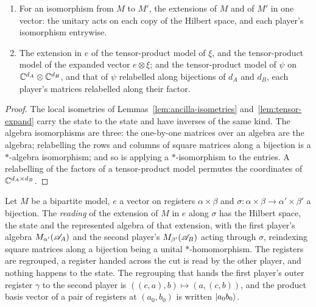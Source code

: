 \begin{lemma}
\begin{enumerate}
    of the two registers; and the extension in $e$ with the players exchanged, and the extension of
    the exchanged model in the exchanged vector, which has the norm of $e$.
  \item For an isomorphism from $M$ to $M'$, the extensions of $M$ and of $M'$ in one vector: the
    unitary acts on each copy of the Hilbert space, and each player's isomorphism entrywise.
  \item The extension in $e$ of the tensor-product model of $\xi$, and the tensor-product model of
    the expanded vector $e \otimes \xi$; and the tensor-product model of $\psi$ on
    $\mathbb{C}^{d_A} \otimes \mathbb{C}^{d_B}$, and that of $\psi$ relabelled along bijections of $d_A$ and $d_B$,
    each player's matrices relabelled along their factor.
\end{enumerate}
\end{lemma}

\begin{proof}
\leanok
The local isometries of Lemmas~\ref{lem:ancilla-isometries} and~\ref{lem:tensor-expand} carry the
state to the state and have inverses of the same kind. The algebra isomorphisms are three: the
one-by-one matrices over an algebra are the algebra; relabelling the rows and columns of square
matrices along a bijection is a $*$-algebra isomorphism; and so is applying a $*$-isomorphism to the
entries. A relabelling of the factors of a tensor-product model permutes the coordinates of
$\mathbb{C}^{d_A \times d_B}$.
\end{proof}

\begin{definition}
\label{def:model-reading}
\leanok
Let $M$ be a bipartite model, $e$ a vector on registers $\alpha \times \beta$ and $\sigma : \alpha
\times \beta \to \alpha' \times \beta'$ a bijection. The \emph{reading} of the extension of $M$ in
$e$ along $\sigma$ has the Hilbert space, the state and the represented algebra of that extension,
with the first player's algebra $M_{\alpha'}(\mathscr{A}_A)$ and the second player's $M_{\beta'}(\mathscr{A}_B)$
acting through $\sigma$, reindexing square matrices along a bijection being a unital
$*$-homomorphism. The registers are regrouped, a register handed across the cut is read by the other
player, and nothing happens to the state. The regrouping that hands the first player's outer
register $\gamma$ to the second player is $((c, a), b) \mapsto (a, (c, b))$, and the product basis
vector of a pair of registers at $(a_0, b_0)$ is written $|a_0 b_0\rangle$.
\end{definition}

